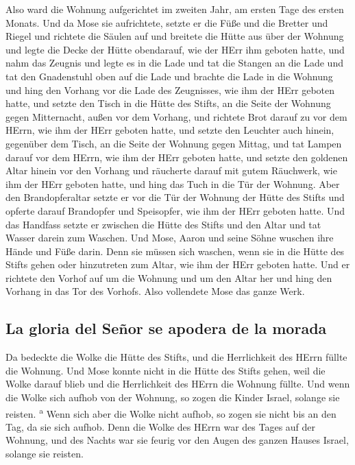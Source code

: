  Also ward die Wohnung aufgerichtet im zweiten Jahr, am
ersten Tage des ersten Monats.  Und da Mose sie
aufrichtete, setzte er die Füße und die Bretter und Riegel und richtete
die Säulen auf  und breitete die Hütte aus über der
Wohnung und legte die Decke der Hütte obendarauf, wie der HErr ihm
geboten hatte,  und nahm das Zeugnis und legte es in die
Lade und tat die Stangen an die Lade und tat den Gnadenstuhl oben auf
die Lade  und brachte die Lade in die Wohnung und hing
den Vorhang vor die Lade des Zeugnisses, wie ihm der HErr geboten hatte,
 und setzte den Tisch in die Hütte des Stifts, an die
Seite der Wohnung gegen Mitternacht, außen vor dem Vorhang,
 und richtete Brot darauf zu vor dem HErrn, wie ihm der
HErr geboten hatte,  und setzte den Leuchter auch hinein,
gegenüber dem Tisch, an die Seite der Wohnung gegen Mittag,
 und tat Lampen darauf vor dem HErrn, wie ihm der HErr
geboten hatte,  und setzte den goldenen Altar hinein vor
den Vorhang  und räucherte darauf mit gutem Räuchwerk,
wie ihm der HErr geboten hatte,  und hing das Tuch in die
Tür der Wohnung.  Aber den Brandopferaltar setzte er vor
die Tür der Wohnung der Hütte des Stifts und opferte darauf Brandopfer
und Speisopfer, wie ihm der HErr geboten hatte.  Und das
Handfass setzte er zwischen die Hütte des Stifts und den Altar und tat
Wasser darein zum Waschen.  Und Mose, Aaron und seine
Söhne wuschen ihre Hände und Füße darin.  Denn sie müssen
sich waschen, wenn sie in die Hütte des Stifts gehen oder hinzutreten
zum Altar, wie ihm der HErr geboten hatte.  Und er
richtete den Vorhof auf um die Wohnung und um den Altar her und hing den
Vorhang in das Tor des Vorhofs. Also vollendete Mose das ganze Werk.

\hypertarget{la-gloria-del-seuxf1or-se-apodera-de-la-morada}{%
\subsection{La gloria del Señor se apodera de la
morada}\label{la-gloria-del-seuxf1or-se-apodera-de-la-morada}}

 Da bedeckte die Wolke die Hütte des Stifts, und die
Herrlichkeit des HErrn füllte die Wohnung.  Und Mose
konnte nicht in die Hütte des Stifts gehen, weil die Wolke darauf blieb
und die Herrlichkeit des HErrn die Wohnung füllte.  Und
wenn die Wolke sich aufhob von der Wohnung, so zogen die Kinder Israel,
solange sie reisten. \textsuperscript{a}  Wenn sich aber
die Wolke nicht aufhob, so zogen sie nicht bis an den Tag, da sie sich
aufhob.  Denn die Wolke des HErrn war des Tages auf der
Wohnung, und des Nachts war sie feurig vor den Augen des ganzen Hauses
Israel, solange sie reisten.
